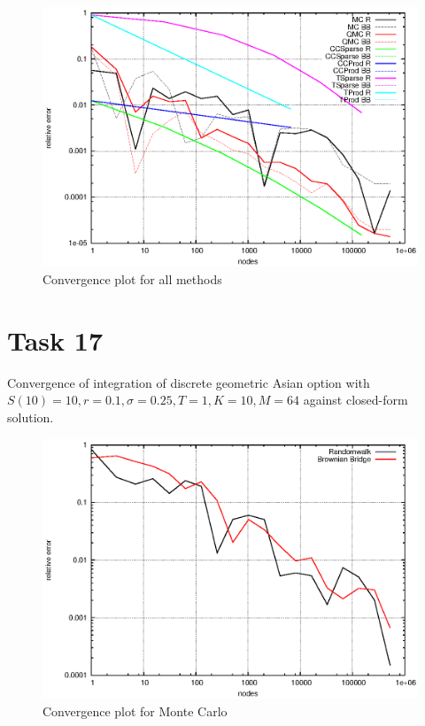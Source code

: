 \documentclass[]{article}
\begin{document}
\begin{figure}[!ht]
\centering
\includegraphics{task16}
\caption{Convergence plot for all methods}
\label{fig:Task16g}
\end{figure}
\clearpage


\section*{Task 17}
Convergence of integration of discrete geometric Asian option with $S(10)=10,r=0.1,\sigma=0.25,T=1,K=10,M=64$ against closed-form solution.
\begin{figure}[!ht]
\centering
\includegraphics{task17_mc}
\caption{Convergence plot for Monte Carlo}
\label{fig:Task17a}
\end{figure}
\end{document}
